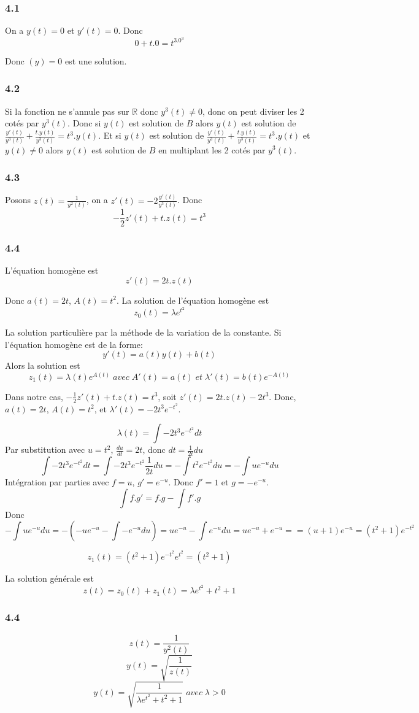 \documentclass[]{book}
\theoremstyle{definition}
\newcommand{\bb}[1]{\mathbb{#1}}
\newcommand{\R}{\bb{R}}
\begin{document}
\subsubsection*{4.1}
On a $y(t) = 0$ et $y'(t) = 0$.
Donc
$$0 + t.0 = t^3.0^3$$

Donc $(y) = 0$ est une solution.

\subsubsection*{4.2}
Si la fonction ne s'annule pas sur $\R$ donc $y^3(t) \neq 0$, donc on peut diviser les 2 cot\'es par $y^3(t)$. Donc si $y(t)$ est solution de $B$ alors $y(t)$ est solution de $\frac{y'(t)}{y^3(t)} + \frac{t.y(t)}{y^3(t)} = t^3.y(t)$. Et si $y(t)$ est solution de $\frac{y'(t)}{y^3(t)} + \frac{t.y(t)}{y^3(t)} = t^3.y(t)$ et $y(t) \neq 0$ alors $y(t)$ est solution de $B$ en multiplant les 2 cot\'es par $y^3(t)$.


\subsubsection*{4.3}
Posons $z(t) = \frac{1}{y^2(t)}$, on a $z'(t) = -2\frac{y'(t)}{y^3(t)}$. Donc
$$-\frac{1}{2}z'(t) + t.z(t) = t^3$$

\subsubsection*{4.4}
L'\'equation homog\`ene est
$$z'(t) = 2t.z(t) $$

Donc $a(t) = 2t$, $A(t) = t^2$. La solution de l'\'equation homog\`ene est
$$z_0(t) = \lambda e^{t^2}$$

La solution particuli\`ere par la m\'ethode de la variation de la constante.
Si l'\'equation homog\`ene est de la forme:
$$y'(t) = a(t)y(t) + b(t)$$
Alors la solution est
$$z_1(t) = \lambda(t) e^{A(t)}\; avec\; A'(t) = a(t)\; et\; \lambda'(t) = b(t)e^{-A(t)}$$


Dans notre cas, $-\frac{1}{2}z'(t) + t.z(t) = t^3$, soit $z'(t) = 2t.z(t) - 2t^3$. Donc, $a(t) = 2t$, $A(t)=t^2$, et $\lambda'(t) = -2t^3e^{-t^2}$.

$$\lambda(t) = \int{-2t^3e^{-t^2}dt}$$
Par substitution avec $u = t^2$, $\frac{du}{dt} = 2t$, donc $dt=\frac{1}{2t}du$
$$\int{-2t^3e^{-t^2}dt} = \int{-2t^3e^{-t^2}\frac{1}{2t}du} = -\int{t^2e^{-t^2}du} = -\int{ue^{-u} du}$$
Int\'egration par parties avec $f=u$, $g'=e^{-u}$. Donc $f'=1$ et $g=-e^{-u}$.
$$\int{f.g'} = f.g - \int{f'.g}$$
Donc
$$-\int{ue^{-u} du} = -(-ue^{-u} - \int{-e^{-u}du}) = ue^{-u} - \int{e^{-u}du} = ue^{-u} + e^{-u} = =(u+1)e^{-u} = (t^2+1)e^{-t^2}$$

$$z_1(t) = (t^2+1)e^{-t^2}e^{t^2} = (t^2+1)$$

La solution g\'en\'erale est
$$z(t) = z_0(t) + z_1(t) = \lambda e^{t^2} + t^2 + 1$$

\subsubsection*{4.4}
$$z(t) = \frac{1}{y^2(t)}$$
$$y(t) = \sqrt{\frac{1}{z(t)}}$$
$$y(t) = \sqrt{\frac{1}{\lambda e^{t^2} + t^2 + 1}}\; avec\; \lambda > 0$$
\end{document}

